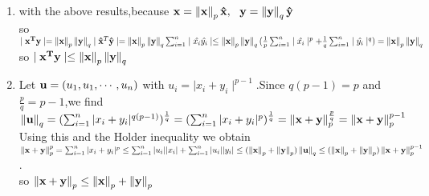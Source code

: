 \documentclass[english,onecolumn,UTF8]{IEEEtran}
\begin{document}
\begin{enumerate}
\begin{enumerate}
	\item with the above results,because $\bold{x}=\left \| \bold x \right \|_p \bold{\hat x},\ \ \bold{y}=\left \|
		\bold y \right \|_q \bold{\hat y}$
		\\so $\mid \bold{x^Ty} \mid=\left \| \bold x \right \|_p \left \| \bold y \right \|_q \mid \bold
		{\hat{x}}^T\bold {\hat{y}} \mid = \left \| \bold x \right \|_p \left \| \bold y \right \|_q\sum_{i=1}^n \mid
		\hat{x_i}\hat{y_i} \mid \leq \left \| \bold x \right \|_p \left \| \bold y \right \|_q(\frac{1}{p}\sum_{i=1}			^n \mid \hat{x_i} \mid^p  +\frac{1}{q}\sum_{i=1}^n \mid \hat{y_i} \mid^q) = \left \| \bold x \right \|_p 				\left \| \bold y \right \|_q$
		\\so $\mid \bold{x^Ty} \mid \leq \left \| \bold x \right \|_p \left \| \bold y \right \|_q $

	\item Let $\bold u = (u_1,u_1,\cdots,u_n)$ with $u_i = \mid x_i +y_i \mid^{p-1}$.Since $q(p-1)=p$ and 
		$\frac{p}{q}=p-1$,we find
		$\left \| \bold u \right \|_q = (\sum_{i=1}^n |x_i+y_i|^{q(p-1)})^\frac{1}{q}= (\sum_{i=1}^n |x_i+y_i|					^p)^\frac{1}{q}= \left \| \bold x +\bold y \right \|_p^{\frac{p}{q}} =\left \| \bold x +\bold y \right \|				_p^{p-1} $
		\\Using this and the Holder inequality we obtain
		\\$\left \| \bold x +\bold y \right \|_p^p = \sum_{i=1}^n |x_i+y_i|^p \leq \sum_{i=1}^n |u_i||x_i|	+
		\sum_{i=1}^n |u_i||y_i|	
		\\ \leq (\left \| \bold x  \right \|_p+\left \| \bold y  \right \|_p)\left \| \bold u 
		\right \|_q \leq (\left \| \bold x  \right \|_p+\left \| \bold y  \right \|_p)\left \| \bold x +\bold y 
		\right \|_p^{p-1}$.
		\\so $\left \| \bold x +\bold y \right \|_p \leq \left \| \bold x  \right \|_p+\left \| \bold y  \right \|_p $
	
		



\end{enumerate}

\end{enumerate}
\end{document}
